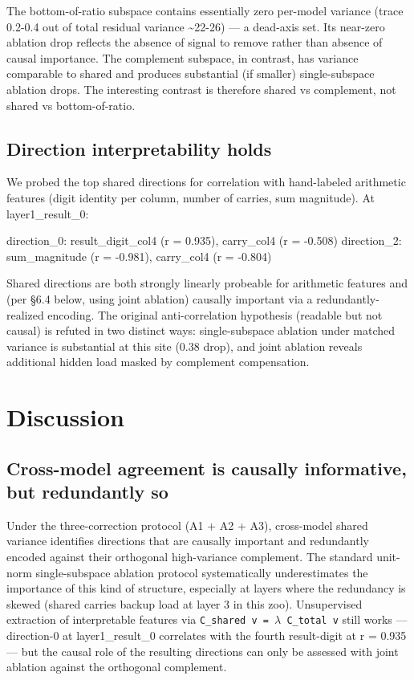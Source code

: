 The bottom-of-ratio subspace contains essentially zero per-model variance
(trace 0.2-0.4 out of total residual variance \textasciitilde{}22-26) --- a dead-axis set.
Its near-zero ablation drop reflects the absence of signal to remove
rather than absence of causal importance. The complement subspace, in
contrast, has variance comparable to shared and produces substantial
(if smaller) single-subspace ablation drops. The interesting contrast is
therefore shared vs complement, not shared vs bottom-of-ratio.

\subsection{Direction interpretability holds}

We probed the top shared directions for correlation with hand-labeled
arithmetic features (digit identity per column, number of carries,
sum magnitude). At layer1\_result\_0:

  direction\_0: result\_digit\_col4 (r = 0.935), carry\_col4 (r = -0.508)
  direction\_2: sum\_magnitude (r = -0.981), carry\_col4 (r = -0.804)

Shared directions are both strongly linearly probeable for arithmetic
features and (per \S{}6.4 below, using joint ablation) causally important
via a redundantly-realized encoding. The original anti-correlation
hypothesis (readable but not causal) is refuted in two distinct ways:
single-subspace ablation under matched variance is substantial at this
site (0.38 drop), and joint ablation reveals additional hidden load
masked by complement compensation.


\section{Discussion}

\subsection{Cross-model agreement is causally informative, but redundantly so}

Under the three-correction protocol (A1 + A2 + A3), cross-model shared
variance identifies directions that are causally important and
redundantly encoded against their orthogonal high-variance complement.
The standard unit-norm single-subspace ablation protocol systematically
underestimates the importance of this kind of structure, especially at
layers where the redundancy is skewed (shared carries backup load at
layer 3 in this zoo). Unsupervised extraction of interpretable features
via \texttt{C\_shared v = $\lambda$ C\_total v} still works --- direction-0 at
layer1\_result\_0 correlates with the fourth result-digit at r = 0.935 ---
but the causal role of the resulting directions can only be assessed
with joint ablation against the orthogonal complement.

